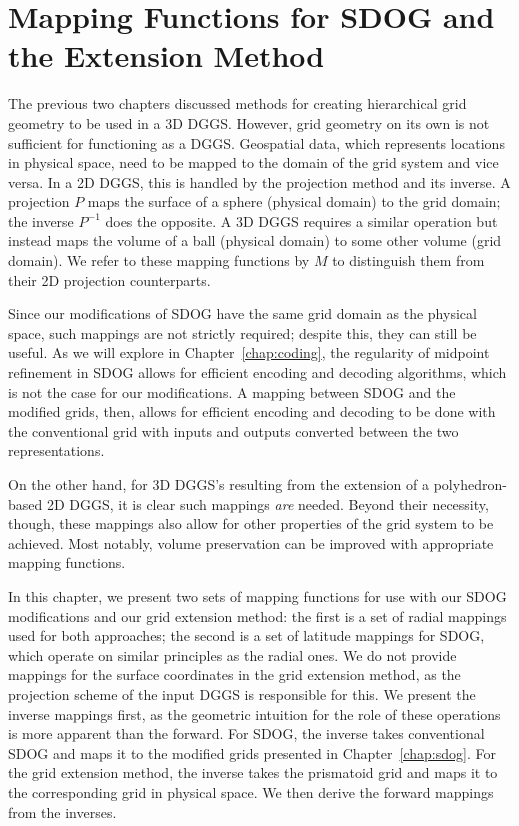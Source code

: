 \chapter{Mapping Functions for SDOG and the Extension Method} \label{chap:mapping}
The previous two chapters discussed methods for creating hierarchical grid geometry to be used in a 3D DGGS.
However, grid geometry on its own is not sufficient for functioning as a DGGS.
Geospatial data, which represents locations in physical space, need to be mapped to the domain of the grid system and vice versa.
In a 2D DGGS, this is handled by the projection method and its inverse.
A projection $P$ maps the surface of a sphere (physical domain) to the grid domain; the inverse $P^{-1}$ does the opposite.
A 3D DGGS requires a similar operation but instead maps the volume of a ball (physical domain) to some other volume (grid domain).
We refer to these mapping functions by $M$ to distinguish them from their 2D projection counterparts.


Since our modifications of SDOG have the same grid domain as the physical space, such mappings are not strictly required; despite this, they can still be useful.
As we will explore in Chapter~\ref{chap:coding}, the regularity of midpoint refinement in SDOG allows for efficient encoding and decoding algorithms, which is not the case for our modifications.
A mapping between SDOG and the modified grids, then, allows for efficient encoding and decoding to be done with the conventional grid with inputs and outputs converted between the two representations.


On the other hand, for 3D DGGS's resulting from the extension of a polyhedron-based 2D DGGS, it is clear such mappings \textit{are} needed.
Beyond their necessity, though, these mappings also allow for other properties of the grid system to be achieved. Most notably, volume preservation can be improved with appropriate mapping functions.


In this chapter, we present two sets of mapping functions for use with our SDOG modifications and our grid extension method:
the first is a set of radial mappings used for both approaches;
the second is a set of latitude mappings for SDOG, which operate on similar principles as the radial ones.
We do not provide mappings for the surface coordinates in the grid extension method, as the projection scheme of the input DGGS is responsible for this.
We present the inverse mappings first, as the geometric intuition for the role of these operations is more apparent than the forward.
For SDOG, the inverse takes conventional SDOG and maps it to the modified grids presented in Chapter~\ref{chap:sdog}.
For the grid extension method, the inverse takes the prismatoid grid and maps it to the corresponding grid in physical space.
We then derive the forward mappings from the inverses.


